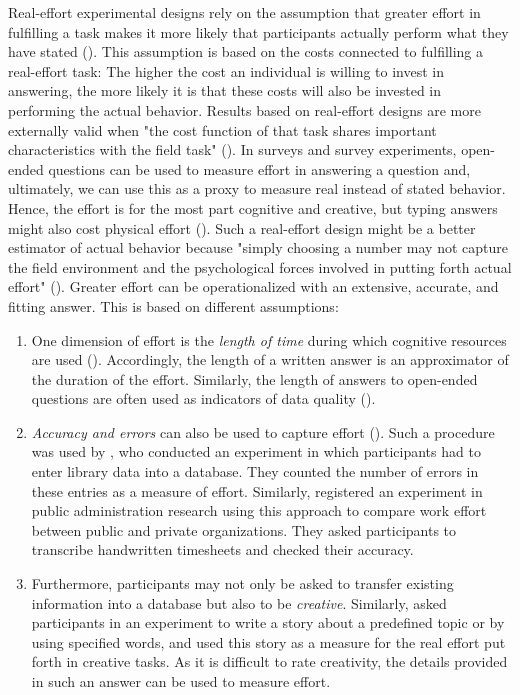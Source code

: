 \documentclass[twocolumn, serif, empirical, authordate]{jote-article}
\begin{document}
Real-effort experimental designs rely on the assumption that greater effort in fulfilling a task makes it more likely that participants actually perform what they have stated (). This assumption is based on the costs connected to fulfilling a real-effort task: The higher the cost an individual is willing to invest in answering, the more likely it is that these costs will also be invested in performing the actual behavior. Results based on real-effort designs are more externally valid when "the cost function of that task shares important characteristics with the field task" (). In surveys and survey experiments, open-ended questions can be used to measure effort in answering a question and, ultimately, we can use this as a proxy to measure real instead of stated behavior. Hence, the effort is for the most part cognitive and creative, but typing answers might also cost physical effort (). Such a real-effort design might be a better estimator of actual behavior because "simply choosing a number may not capture the field environment and the psychological forces involved in putting forth actual effort" (). Greater effort can be operationalized with an extensive, accurate, and fitting answer. This is based on different assumptions: \begin{enumerate} \def\labelenumi{\arabic{enumi}.} \item One dimension of effort is the \emph{length of time} during which cognitive resources are used ().
 Accordingly, the length of a written answer is an approximator of the duration of the effort. Similarly, the length of answers to open-ended questions are often used as indicators of data quality ().
\item \emph{Accuracy and errors} can also be used to capture effort (). Such a procedure was used by \textcite{Gneezy2006}, who conducted an experiment in which participants had to enter library data into a database. They counted the number of errors in these entries as a measure of effort. Similarly, \textcite{Andersen2018} registered an experiment in public administration research using this approach to compare work effort between public and private organizations. They asked participants to transcribe handwritten timesheets and checked their accuracy.
\item Furthermore, participants may not only be asked to transfer existing information into a database but also to be \emph{creative}. Similarly, \textcite{Charness2018} asked participants in an experiment to write a story about a predefined topic or by using specified words, and used this story as a measure for the real effort put forth in creative tasks. As it is difficult to rate creativity, the details provided in such an answer can be used to measure effort.
\end{enumerate} 
\end{document}
